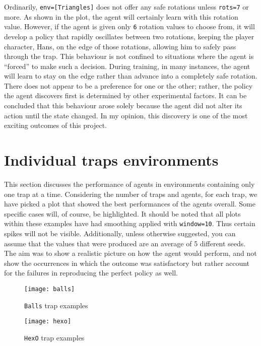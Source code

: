 Ordinarily, \texttt{env=[Triangles]} does not offer any safe rotations unless \texttt{rots=7} or more. As shown in the plot, the agent will certainly learn with this rotation value. However, if the agent is given only \texttt{6} rotation values to choose from, it will develop a policy that rapidly oscillates between two rotations, keeping the player character, Hans, on the edge of those rotations, allowing him to safely pass through the trap. This behaviour is not confined to situations where the agent is ``forced'' to make such a decision. During training, in many instances, the agent will learn to stay on the edge rather than advance into a completely safe rotation. There does not appear to be a preference for one or the other; rather, the policy the agent discovers first is determined by other experimental factors. It can be concluded that this behaviour arose solely because the agent did not alter its action until the state changed. In my opinion, this discovery is one of the most exciting outcomes of this project.

\section{Individual traps environments}
This section discusses the performance of agents in environments containing only one trap at a time.  Considering the number of traps and agents, for each trap, we have picked a plot that showed the best performances of the agents overall. Some specific cases will, of course, be highlighted. It should be noted that all plots within these examples have had smoothing applied with \texttt{window=10}. Thus certain spikes will not be visible. Additionally, unless otherwise suggested, you can assume that the values that were produced are an average of 5 different seeds. The aim was to show a realistic picture on how the agent would perform, and not show the occurrences in which the outcome was satisfactory but rather account for the failures in reproducing the perfect policy as well.

\begin{figure}[h]
    \centering
    \texttt{[image: balls]}
    \caption{\texttt{Balls} trap examples}
    \label{fig:balls_eg}
\end{figure}

\begin{figure}[h]
    \centering
    \texttt{[image: hexo]}
    \caption{\texttt{HexO} trap examples}
    \label{fig:hexo_eg}
\end{figure}

